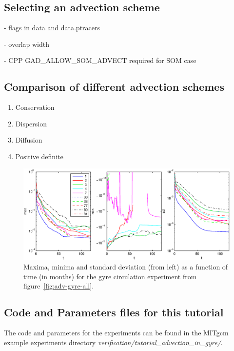\subsection{Selecting an advection scheme}

- flags in data and data.ptracers

- overlap width

- CPP GAD\_ALLOW\_SOM\_ADVECT required for SOM case

\subsection{Comparison of different advection schemes}

\begin{enumerate}
\item{Conservation}
\item{Dispersion}
\item{Diffusion}
\item{Positive definite}
\end{enumerate}



\begin{figure}
\begin{center}
 \includegraphics*[width=\textwidth]{s_examples/advection_in_gyre/stats.eps}
\end{center}
\caption{Maxima, minima and standard deviation (from left) as a function of time (in months)
for the gyre circulation experiment from figure~\ref{fig:adv-gyre-all}.}
\label{fig:adv-gyre-stats}
\end{figure}

\subsection{Code and Parameters files for this tutorial}

The code and parameters for the experiments can be found in the MITgcm example experiments 
directory {\it verification/tutorial\_advection\_in\_gyre/}.







